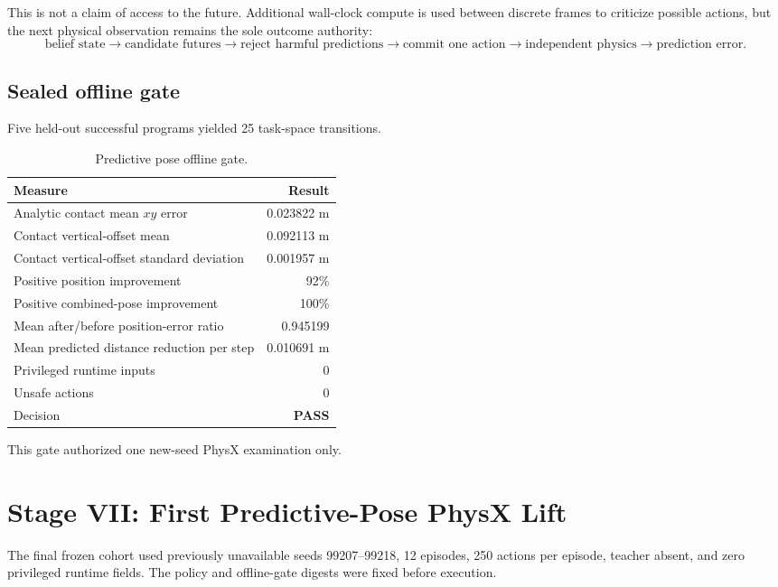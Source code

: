 \documentclass[11pt,a4paper]{article}
\newcommand{\pass}{\textcolor{green!45!black}{\textbf{PASS}}}
\begin{document}
This is not a claim of access to the future.  Additional wall-clock compute is
used between discrete frames to criticize possible actions, but the next
physical observation remains the sole outcome authority:
\begin{equation}
\text{belief state}
\rightarrow \text{candidate futures}
\rightarrow \text{reject harmful predictions}
\rightarrow \text{commit one action}
\rightarrow \text{independent physics}
\rightarrow \text{prediction error}.
\label{eq:predictive-loop}
\end{equation}

\subsection{Sealed offline gate}

Five held-out successful programs yielded 25 task-space transitions.

\begin{table}[H]
\centering
\caption{Predictive pose offline gate.}
\begin{tabular}{lr}
\toprule
Measure & Result \\
\midrule
Analytic contact mean $xy$ error & 0.023822 m \\
Contact vertical-offset mean & 0.092113 m \\
Contact vertical-offset standard deviation & 0.001957 m \\
Positive position improvement & 92\% \\
Positive combined-pose improvement & 100\% \\
Mean after/before position-error ratio & 0.945199 \\
Mean predicted distance reduction per step & 0.010691 m \\
Privileged runtime inputs & 0 \\
Unsafe actions & 0 \\
Decision & \pass \\
\bottomrule
\end{tabular}
\end{table}

This gate authorized one new-seed PhysX examination only.

\section{Stage VII: First Predictive-Pose PhysX Lift}

The final frozen cohort used previously unavailable seeds 99207--99218, 12
episodes, 250 actions per episode, teacher absent, and zero privileged runtime
fields.  The policy and offline-gate digests were fixed before execution.
\end{document}
